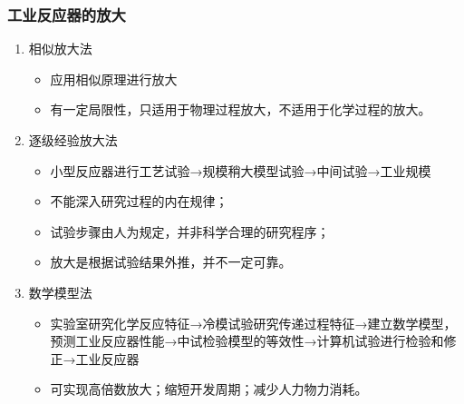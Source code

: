 \documentclass[dvipsnames, svgnames, x11names]{beamer}
\begin{document}
\begin{frame}
    \frametitle{工业反应器的放大}
    \begin{enumerate}
      \item 相似放大法
        \begin{itemize}
          \item 应用相似原理进行放大
          \item 有一定局限性，只适用于物理过程放大，不适用于化学过程的放大。
        \end{itemize}
      \item 逐级经验放大法
        \begin{itemize}
          \item 小型反应器进行工艺试验→规模稍大模型试验→中间试验→工业规模
          \item 不能深入研究过程的内在规律；
          \item 试验步骤由人为规定，并非科学合理的研究程序；
          \item 放大是根据试验结果外推，并不一定可靠。
        \end{itemize}
      \item 数学模型法
        \begin{itemize}
          \item 实验室研究化学反应特征→冷模试验研究传递过程特征→建立数学模型，预测工业反应器性能→中试检验模型的等效性→计算机试验进行检验和修正→工业反应器
          \item 可实现高倍数放大；缩短开发周期；减少人力物力消耗。
        \end{itemize}
    \end{enumerate}
\end{frame}

\end{document}
